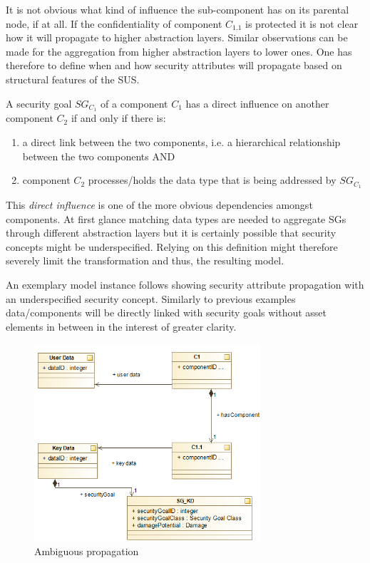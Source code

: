 It is not obvious what kind of influence the sub-component has on its parental node, if at all. If the confidentiality of component $C_{1.1}$ is protected it is not clear how it will propagate to higher abstraction layers. Similar observations can be made for the aggregation from higher abstraction layers to lower ones. One has therefore to define when and how security attributes will propagate based on structural features of the SUS.

\begin{theorem}
A security goal $SG_{C_1}$ of a component $C_1$ has a direct influence on another component $C_2$ if and only if there is: 
\begin{enumerate}
\item a direct link between the two components, i.e. a hierarchical relationship between the two components AND
\item component $C_2$ processes/holds the data type that is being addressed by $SG_{C_1}$
\end{enumerate} 
\end{theorem}

This \textit{direct influence} is one of the more obvious dependencies amongst components. At first glance matching data types are needed to aggregate SGs through different abstraction layers but it is certainly possible that security concepts might be underspecified. Relying on this definition might therefore severely limit the transformation and thus, the resulting model.

An exemplary model instance follows showing security attribute propagation with an underspecified security concept. Similarly to previous examples data/components will be directly linked with security goals without asset elements in between in the interest of greater clarity.

\begin{figure}[H]
\centering
\includegraphics[width=0.75\textwidth]{pictures/sg_deduction.png}
\caption{Ambiguous propagation}
\label{fig:subcomponent_dilemma}
\end{figure} 

